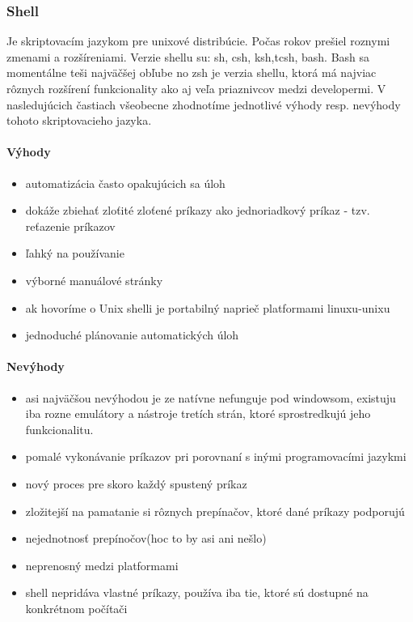 \subsubsection{Shell}
\indent
Je skriptovacím jazykom pre unixové distribúcie. Počas rokov prešiel roznymi zmenami a rozšíreniami. Verzie shellu su: sh, csh, ksh,tcsh, bash. Bash sa momentálne teši najväčšej obľube no zsh je verzia shellu, ktorá má najviac rôznych rozšírení funkcionality ako aj veľa priaznivcov medzi developermi. V nasledujúcich častiach všeobecne zhodnotíme jednotlivé výhody resp. nevýhody tohoto skriptovacieho jazyka.

\paragraph{Výhody}
\begin{itemize}
	\item automatizácia často opakujúcich sa úloh
	\item dokáže zbiehať zloťité zloťené príkazy ako jednoriadkový príkaz  - tzv. reťazenie príkazov
	\item ľahký na používanie
	\item výborné manuálové stránky
	\item ak hovoríme o Unix shelli je portabilný naprieč platformami linuxu-unixu
	\item jednoduché plánovanie automatických úloh
	\newline
\end{itemize}
\paragraph{Nevýhody}
\begin{itemize}
	\item asi najväčšou nevýhodou je ze natívne nefunguje pod windowsom, existuju iba rozne emulátory a nástroje tretích strán, ktoré sprostredkujú jeho funkcionalitu.
	\item pomalé vykonávanie príkazov pri porovnaní s inými programovacími jazykmi
	\item nový proces pre skoro každý spustený príkaz
	\item zložitejší na pamatanie si rôznych prepínačov, ktoré dané príkazy podporujú
	\item nejednotnosť prepínočov(hoc to by asi ani nešlo)
	\item neprenosný medzi platformami
	\item shell nepridáva vlastné príkazy, používa iba tie, ktoré sú dostupné na konkrétnom počítači
\end{itemize}
